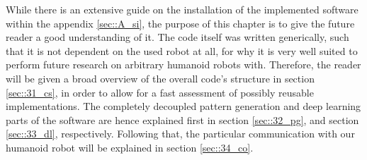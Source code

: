 \label{sec::3_me}
While there is an extensive guide on the installation of the implemented software within the appendix \ref{sec::A_si}, the purpose of this chapter is to give the future reader a good understanding of it. The code itself was written generically, such that it is not dependent on the used robot at all, for why it is very well suited to perform future research on arbitrary humanoid robots with. Therefore, the reader will be given a broad overview of the overall code's structure in section \ref{sec::31_cs}, in order to allow for a fast assessment of possibly reusable implementations. The completely decoupled pattern generation and deep learning parts of the software are hence explained first in section \ref{sec::32_pg}, and section \ref{sec::33_dl}, respectively. Following that, the particular communication with our humanoid robot will be explained in section \ref{sec::34_co}.







